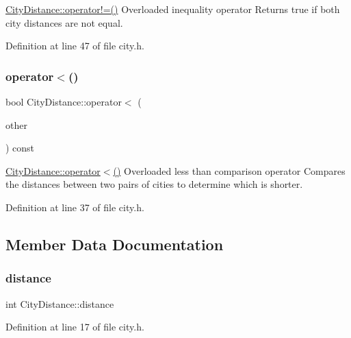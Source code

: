 \mbox{\hyperlink{struct_city_distance_ae56feb19d11926e9d3bc03b5abfc9b48}{City\+Distance\+::operator!=()}} Overloaded inequality operator Returns true if both city distances are not equal. 



Definition at line 47 of file city.\+h.

\mbox{\label{struct_city_distance_a6195d187d1f0309e67ee62b3a5b56b86}} 
\subsubsection{\texorpdfstring{operator$<$()}{operator<()}}
{\footnotesize\ttfamily bool City\+Distance\+::operator$<$ (\begin{DoxyParamCaption}\item[{const \mbox{\hyperlink{struct_city_distance}{City\+Distance}} \&}]{other }\end{DoxyParamCaption}) const\hspace{0.3cm}{\ttfamily [inline]}}



\mbox{\hyperlink{struct_city_distance_a6195d187d1f0309e67ee62b3a5b56b86}{City\+Distance\+::operator$<$()}} Overloaded less than comparison operator Compares the distances between two pairs of cities to determine which is shorter. 



Definition at line 37 of file city.\+h.



\subsection{Member Data Documentation}
\mbox{\label{struct_city_distance_aabe1e1bba711dab73cd70f1105c35c9e}} 
\subsubsection{\texorpdfstring{distance}{distance}}
{\footnotesize\ttfamily int City\+Distance\+::distance}



Definition at line 17 of file city.\+h.

